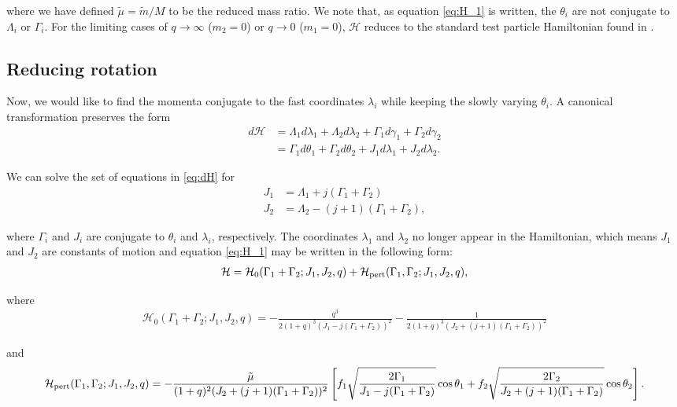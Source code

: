 \documentclass[usenatbib]{mnras}
\begin{document}
\noindent where we have defined \(\tilde\mu=\tilde m/M\) to be
the reduced mass ratio.  We note that, as equation \eqref{eq:H_1} is
written, the \(\theta_i\) are not conjugate to \(\Lambda_i\) or
\(\Gamma_i\).  For the limiting cases of \(q\to \infty\) (\(m_2=0\)) or
\(q\to 0\) (\(m_1=0\)), \(\mathcal{H}\) reduces to the standard test
particle Hamiltonian found in \citet{murray_solar_2000}.
\subsection{Reducing rotation}
\label{sec:orgf3c548d}
Now, we would like to find the momenta conjugate to the fast
coordinates \(\lambda_i\) while keeping the slowly varying \(\theta_i\).
A canonical transformation preserves the form
\begin{align}
  \label{eq:dH} 
  d\mathcal{H}
  &= \Lambda_1 d\lambda_1+\Lambda_2d\lambda_2
    + \Gamma_1d\gamma_1+\Gamma_2d\gamma_2\nonumber\\
  &= \Gamma_1 d\theta_1 + \Gamma_2 d\theta_2
    +J_1 d\lambda_1+J_2d\lambda_2 .
\end{align}

\noindent
We can solve the set of equations in \eqref{eq:dH} for
\begin{align}
\label{eq:J1}
J_1 &= \Lambda_1 + j(\Gamma_1+\Gamma_2)\\
\label{eq:J2}
J_2 &= \Lambda_2 - (j+1)(\Gamma_1+\Gamma_2),
\end{align}

\noindent where \(\Gamma_i\) and \(J_i\) are conjugate to
\(\theta_i\) and \(\lambda_i\), respectively.
The coordinates \(\lambda_1\) and \(\lambda_2\)
no longer appear in the Hamiltonian,
which means \(J_1\) and \(J_2\) are constants of motion and
equation \eqref{eq:H_1} may be written
in the following form:
\begin{align}
\label{eq:H_2}
  \mathcal{H}
  = \mathcal{H}_0(\Gamma_1+\Gamma_2; J_1, J_2, q)
                  + \mathcal{H}_{\rm pert}(\Gamma_1,\Gamma_2; J_1, J_2, q),
\end{align}

\noindent
where
\begin{align}
  \label{eq:H01}
  \mathcal{H}_0(\Gamma_1+\Gamma_2; J_1, J_2, q)
  = -\frac{q^3}{2(1+q)^3(J_1-j(\Gamma_1+\Gamma_2))^2}
  -\frac{1}{2(1+q)^3(J_2+(j+1)(\Gamma_1+\Gamma_2))^2} 
\end{align}

\noindent
and
\begin{align}
  \label{eq:Hpert1}
  \mathcal{H}_{\rm pert}(\Gamma_1,\Gamma_2; J_1, J_2, q)
  = -\frac{\tilde\mu}{(1+q)^2(J_2+(j+1)(\Gamma_1+\Gamma_2))^2}
  \left[
    f_1\sqrt{\frac{2\Gamma_1}{J_1 - j(\Gamma_1+\Gamma_2)}}\cos\theta_1
  +f_2\sqrt{\frac{2\Gamma_2}{J_2 + (j+1)(\Gamma_1+\Gamma_2)}}\cos\theta_2
    \right].
\end{align}
\end{document}
